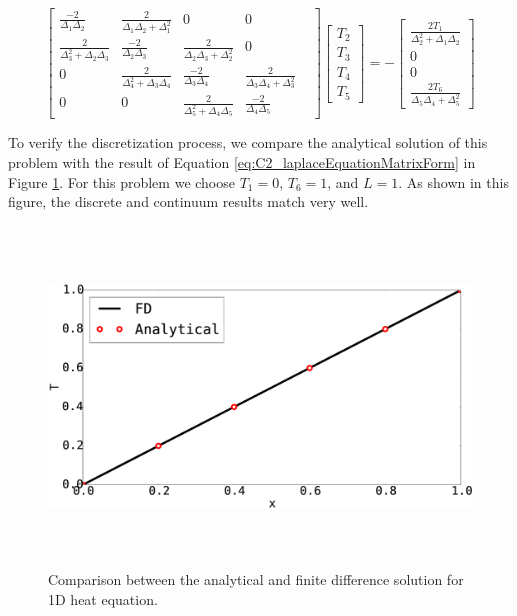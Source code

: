 \begin{equation}\label{eq:C2_laplaceEquationMatrixForm}
	\begin{bmatrix}
		\frac{-2}{\Delta_{1} \Delta_{2}} &
		\frac{2}{\Delta_{1} \Delta_{2} + \Delta_{1}^2} &
		0 &
		0 &
		\\
		\frac{2}{\Delta_{3}^2 + \Delta_{2} \Delta_{3}} & 
		\frac{-2}{\Delta_{2} \Delta_{3}} &
		\frac{2}{\Delta_{2} \Delta_{3} + \Delta_{2}^2} &
		0
		\\
		0 &
		\frac{2}{\Delta_{4}^2 + \Delta_{3} \Delta_{4}} & 
		\frac{-2}{\Delta_{3} \Delta_{4}} &
		\frac{2}{\Delta_{3} \Delta_{4} + \Delta_{3}^2} &
		\\
		0 &
		0 &
		\frac{2}{\Delta_{5}^2 + \Delta_{4} \Delta_{5}} & 
		\frac{-2}{\Delta_{4} \Delta_{5}}
	\end{bmatrix}
	\begin{bmatrix}
		T_2 \\
		T_3 \\
		T_4 \\
		T_5
	\end{bmatrix}
	=
	-\begin{bmatrix}
	 	\frac{2T_1}{\Delta_{2}^2 + \Delta_{1} \Delta_{2}} \\
 		0 \\
		0 \\
		\frac{2T_6}{\Delta_{5} \Delta_{4} + \Delta_{5}^2}
	\end{bmatrix}
\end{equation}

To verify the discretization process, we compare the analytical solution of this problem with the result of Equation \eqref{eq:C2_laplaceEquationMatrixForm} in Figure \ref{fig:C2_verificationOfSolver}. For this problem we choose $T_1 = 0$, $T_6 = 1$, and $L = 1$.  As shown in this figure, the discrete and continuum results match very well.

\begin{figure}[h]
	\centering
	\includegraphics[height=9.00cm]{Chapter_2/figure/finitedifference_vs_analytical.eps}
	\caption{Comparison between the analytical and finite difference solution for 1D heat equation.}
	\label{fig:C2_verificationOfSolver}
\end{figure}

